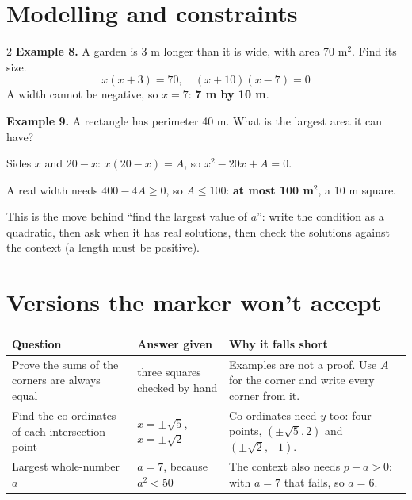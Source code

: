\documentclass[11pt]{article}
\begin{document}
\section{Modelling and constraints}\label{h4:model}
\begin{multicols}{2}
\textbf{Example 8.} A garden is 3 m longer than it is wide, with area 70 m$^{2}$. Find its size.
\[ x(x+3) = 70,\quad (x+10)(x-7) = 0 \]
A width cannot be negative, so $x = 7$: \textbf{7 m by 10 m}. 
\columnbreak

\textbf{Example 9.} A rectangle has perimeter 40 m. What is the largest area it can have?\par
Sides $x$ and $20 - x$: $x(20 - x) = A$, so $x^{2} - 20x + A = 0$.\par
A real width needs $400 - 4A \geq 0$, so $A \leq 100$: \textbf{at most 100 m$^{2}$}, a 10 m square. 
\end{multicols}
This is the move behind ``find the largest value of $a$'': write the condition as a quadratic, then ask when it has real solutions, then check the solutions against the context (a length must be positive).

\section{Versions the marker won't accept}\label{h4:wontaccept}
\begin{tabularx}{\textwidth}{@{}>{\raggedright}p{} >{\raggedright}p{} X@{}}
\toprule
\textbf{Question} & \textbf{Answer given} & \textbf{Why it falls short} \\ \midrule
Prove the sums of the corners are always equal & three squares checked by hand & Examples are not a proof. Use $A$ for the corner and write every corner from it. \tabularnewline
Find the co-ordinates of each intersection point & $x = \pm\sqrt{5}$, $x = \pm\sqrt{2}$ & Co-ordinates need $y$ too: four points, $(\pm\sqrt{5}, 2)$ and $(\pm\sqrt{2}, -1)$. \tabularnewline
Largest whole-number $a$ & $a = 7$, because $a^{2} < 50$ & The context also needs $p - a > 0$: with $a = 7$ that fails, so $a = 6$. \tabularnewline
\bottomrule
\end{tabularx}

\end{document}
